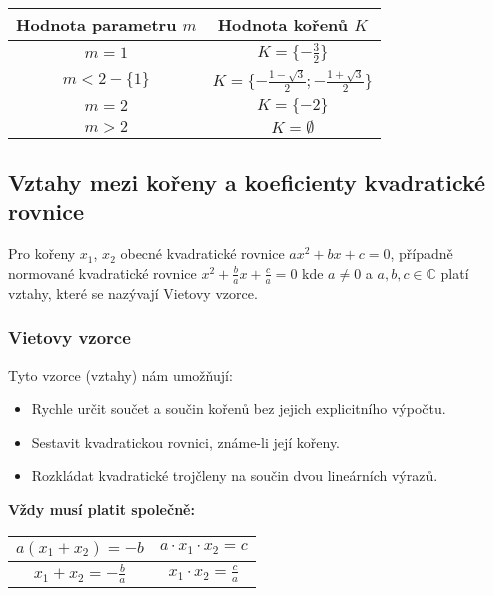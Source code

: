             \begin{center}
            \begin{tabular}{||c| c||} 
             \hline
             \textbf{Hodnota parametru $m$} & \textbf{Hodnota kořenů $K$} \\ [0.5ex] 
             \hline\hline
             $m=1$ & $K=\{-\frac{3}{2}\}$ \\
             \hline
             $m<2-\{1\}$ & $K=\{-\frac{1-\sqrt{3}}{2};-\frac{1+\sqrt{3}}{2}\}$ \\
             \hline
             $m=2$ & $K=\{-2\}$\\
             \hline
             $m>2$ & $K=\emptyset$\\
             \hline
            \end{tabular}
            \end{center}

    \subsection{Vztahy mezi kořeny a koeficienty kvadratické rovnice}
Pro kořeny $x_1$, $x_2$ obecné kvadratické rovnice $ax^2+bx+c=0$, případně normované kvadratické rovnice $x^2+\frac{b}{a}x+\frac{c}{a}=0$ kde $a\not=0$ a $a,b,c \in \mathbb{C}$ platí vztahy, které se nazývají Vietovy vzorce.
        \subsubsection{Vietovy vzorce}
Tyto vzorce (vztahy) nám umožňují:
\begin{itemize}
    \item Rychle určit součet a součin kořenů bez jejich explicitního výpočtu.
    \item Sestavit kvadratickou rovnici, známe-li její kořeny.
    \item Rozkládat kvadratické trojčleny na součin dvou lineárních výrazů.
\end{itemize}
\textbf{Vždy musí platit společně:}\\
\begin{center}
            \begin{tabular}{||c| c||} 
             \hline
             $a(x_1+x_2)=-b$ & $a\cdot x_1\cdot x_2=c$ \\
             \hline
             $x_1+x_2=-\frac{b}{a}$ & $ x_1 \cdot x_2=\frac{c}{a}$ \\
             \hline
            \end{tabular}
            \end{center}